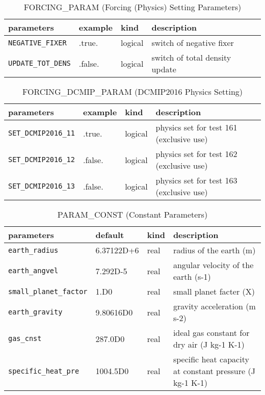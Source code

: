\begin{table}[htb]
\begin{center}
\caption{FORCING\_PARAM (Forcing (Physics) Setting Parameters)}
\begin{tabularx}{150mm}{|l|l|l|X|} \hline
 \rowcolor[gray]{0.9} parameters & example & kind & description          \\ \hline
 \verb|NEGATIVE_FIXER|  & .true.  & logical & switch of negative fixer \\ \hline
 \verb|UPDATE_TOT_DENS| & .false. & logical & switch of total density update \\ \hline
\end{tabularx}
\end{center}
\end{table}

\begin{table}[htb]
\begin{center}
\caption{FORCING\_DCMIP\_PARAM (DCMIP2016 Physics Setting)}
\begin{tabularx}{150mm}{|l|l|l|X|} \hline
 \rowcolor[gray]{0.9} parameters & example & kind & description          \\ \hline
 \verb|SET_DCMIP2016_11| & .true.  & logical & physics set for test 161 (exclusive use) \\ \hline
 \verb|SET_DCMIP2016_12| & .false. & logical & physics set for test 162 (exclusive use) \\ \hline
 \verb|SET_DCMIP2016_13| & .false. & logical & physics set for test 163 (exclusive use) \\ \hline
\end{tabularx}
\end{center}
\end{table}

\begin{table}[htb]
\begin{center}
\caption{PARAM_CONST (Constant Parameters)}
\begin{tabularx}{150mm}{|l|l|l|X|} \hline
 \rowcolor[gray]{0.9} parameters & default & kind & description          \\ \hline
 \verb|earth_radius| & 6.37122D+6  & real & radius of the earth (m) \\ \hline
 \verb|earth_angvel| & 7.292D-5    & real & angular velocity of the earth (s-1) \\ \hline
 \verb|small_planet_factor| & 1.D0 & real & small planet facter (X) \\ \hline
 \verb|earth_gravity|       & 9.80616D0 & real & gravity acceleration (m s-2) \\ \hline
 \verb|gas_cnst|            & 287.0D0   & real & ideal gas constant for dry air (J kg-1 K-1) \\ \hline
 \verb|specific_heat_pre|   & 1004.5D0  & real & specific heat capacity at constant pressure (J kg-1 K-1) \\ \hline
\end{tabularx}
\end{center}
\end{table}

